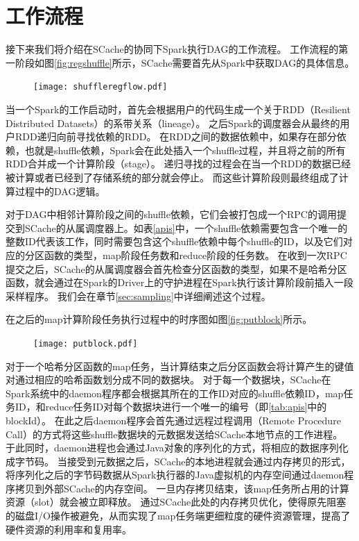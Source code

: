 \section{工作流程}

接下来我们将介绍在SCache的协同下Spark执行DAG的工作流程。
工作流程的第一阶段如图\ref{fig:regshuffle}所示，SCache需要首先从Spark中获取DAG的具体信息。

\begin{figure}[!htp]
	\centering
	\texttt{[image: shuffleregflow.pdf]}
\end{figure}

当一个Spark的工作启动时，首先会根据用户的代码生成一个关于RDD（Resilient Distributed Datasets）的系带关系（lineage）。
之后Spark的调度器会从最终的用户RDD递归向前寻找依赖的RDD。
在RDD之间的数据依赖中，如果存在部分依赖，也就是shuffle依赖，Spark会在此处插入一个shuffle过程，并且将之前的所有RDD合并成一个计算阶段（stage）。
递归寻找的过程会在当一个RDD的数据已经被计算或者已经到了存储系统的部分就会停止。
而这些计算阶段则最终组成了计算过程中的DAG逻辑。

对于DAG中相邻计算阶段之间的shuffle依赖，它们会被打包成一个RPC的调用提交到SCache的从属调度器上。如表\ref{apis}中，一个shuffle依赖需要包含一个唯一的整数ID代表该工作，同时需要包含这个shuffle依赖中每个shuffle的ID，以及它们对应的分区函数的类型，map阶段任务数和reduce阶段的任务数。
在收到一次RPC提交之后，SCache的从属调度器会首先检查分区函数的类型，如果不是哈希分区函数，就会通过在Spark的Driver上的守护进程在Spark执行该计算阶段前插入一段采样程序。
我们会在章节\ref{sec:sampling}中详细阐述这个过程。

在之后的map计算阶段任务执行过程中的时序图如图\ref{fig:putblock}所示。

\begin{figure}[!htp]
	\centering
	\texttt{[image: putblock.pdf]}
\end{figure}

对于一个哈希分区函数的map任务，当计算结束之后分区函数会将计算产生的键值对通过相应的哈希函数划分成不同的数据块。
对于每一个数据块，SCache在Spark系统中的daemon程序都会根据其所在的工作ID对应的shuffle依赖ID，map任务ID，和reduce任务ID对每个数据块进行一个唯一的编号（即\ref{tab:apis}中的blockId）。
在此之后daemon程序会首先通过远程过程调用（Remote Procedure Call）的方式将这些shuffle数据块的元数据发送给SCache本地节点的工作进程。
于此同时，daemon进程也会通过Java对象的序列化的方式，将相应的数据序列化成字节码。
当接受到元数据之后，SCache的本地进程就会通过内存拷贝的形式，将序列化之后的字节码数据从Spark执行器的Java虚拟机的内存空间通过daemon程序拷贝到外部SCache的内存空间。
一旦内存拷贝结束，该map任务所占用的计算资源（slot）就会被立即释放。
通过SCache此处的内存拷贝优化，使得原先阻塞的磁盘I/O操作被避免，从而实现了map任务端更细粒度的硬件资源管理，提高了硬件资源的利用率和复用率。

